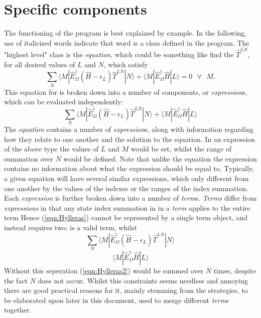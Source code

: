 \documentclass[12pt]{article}
\begin{document}
\section{ Specific components}
The functioning of the program is best explained by example. In the following,
use of italicized words indicate that word is a class defined in the program.
The "highest level" class is the \emph{equation}, which could be something like 
find the $\hat{T}^{LN}$, for all desired values of $L$ and $N$, which satisfy 
\begin{equation}
\sum_{N} 
\langle M | \hat{E}^{\dagger}_{\Omega} (\hat{H}-\epsilon_{L}) \hat{T}^{LN} | N \rangle  +
\langle M | \hat{E}^{\dagger}_{\Omega} \hat{H} | L  \rangle = 0 \text{ \ \ \ \ } \forall \text{ \ \ }  M . 
\end{equation}
\noindent This equation for is broken down into a number of components, 
or \emph{expression}s, which can be evaluated independently:
\begin{equation}
\sum_{N} 
\langle M | \hat{E}^{\dagger}_{\Omega} (\hat{H}-\epsilon_{L}) \hat{T}^{LN} | N \rangle  +
\langle M | \hat{E}^{\dagger}_{\Omega} \hat{H} | L  \rangle  
\label{eqn:Hylleras}
\end{equation}
\noindent The \emph{equation} contains a number of \emph{expression}s, along with
information regarding how they relate to one another and the solution to the equation.
In an expression of the above type the values of $L$ and $M$  would be set, whilst the range of
summation over $N$ would be defined. Note that unlike the equation the expression
contains no information about what the expression should be equal to.
Typically, a given equation will have several similar expressions,
which only different from one another by the values of the indexes or the 
ranges of the index summation.\\

\noindent Each \emph{expression} is further broken down into a number of \emph{term}s.
\emph{Terms} differ from \emph{expressions} in that any state index summation in
in a \emph{term} applies to the entire term
Hence (\ref{eqn:Hylleras}) cannot be represented by a single term object, and instead
requires two: is a valid term, whilst
\begin{equation}
\sum_{N} 
\langle M | \hat{E}^{\dagger}_{\Omega} (\hat{H}-\epsilon_{L}) \hat{T}^{LN} | N \rangle  
\label{eqn:Hylleras1}
\end{equation}
\begin{equation}
\langle M | \hat{E}^{\dagger}_{\Omega} \hat{H} | L  \rangle  
\label{eqn:Hylleras2}
\end{equation}
\noindent Without this seperation (\ref{eqn:Hylleras2}) would be summed over $N$ times,
despite the fact $N$ does not occur. 
Whilst this constraints seems needless and annoying there are good practical reasons for it, mainly stemming
from the strategies, to be elaborated upon later in this document, used to merge different \emph{term}s together. \\ 
\end{document}

